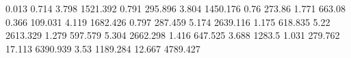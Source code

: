 0.013      0.714      %
3.798      1521.392   %
0.791      295.896    %
3.804      1450.176   %
0.76       273.86     %
1.771      663.08     %
0.366      109.031    %
4.119      1682.426   %
0.797      287.459    %
5.174      2639.116   %
1.175      618.835    %
5.22       2613.329   %
1.279      597.579    %
5.304      2662.298   %
1.416      647.525    %
3.688      1283.5     %
1.031      279.762    %
17.113     6390.939   %
3.53       1189.284   %
12.667     4789.427   %
